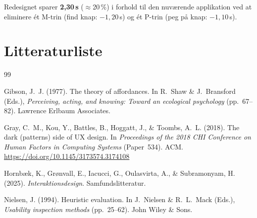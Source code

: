 \documentclass[12pt,a4paper]{article}
\begin{document}
\noindent Redesignet sparer \textbf{2{,}30\,s} ($\approx$20\,\%) i forhold til den nuværende
applikation ved at eliminere ét M-trin (find knap: $-1{,}20$\,s) og ét P-trin
(peg på knap: $-1{,}10$\,s).


\newpage
\section*{Litteraturliste}

\begin{thebibliography}{99}

Gibson, J.~J. (1977).
The theory of affordances.
In R.~Shaw \& J.~Bransford (Eds.),
\textit{Perceiving, acting, and knowing: Toward an ecological psychology}
(pp.~67--82).
Lawrence Erlbaum Associates.

Gray, C.~M., Kou, Y., Battles, B., Hoggatt, J., \& Toombs, A.~L. (2018).
The dark (patterns) side of UX design.
In \textit{Proceedings of the 2018 CHI Conference on Human Factors in
Computing Systems} (Paper~534).
ACM.
\url{https://doi.org/10.1145/3173574.3174108}

Hornbæk, K., Grønvall, E., Iacucci, G., Oulasvirta, A., \& Subramonyam, H.
(2025).
\textit{Interaktionsdesign}.
Samfundslitteratur.

Nielsen, J. (1994).
Heuristic evaluation.
In J.~Nielsen \& R.~L.~Mack (Eds.),
\textit{Usability inspection methods}
(pp.~25--62).
John Wiley \& Sons.

\end{thebibliography}
\end{document}
